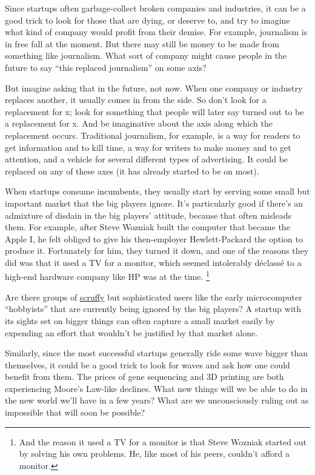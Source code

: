 \documentclass[12pt]{book}
\begin{document}
Since startups often garbage-collect broken companies and industries, it
can be a good trick to look for those that are dying, or deserve to, and
try to imagine what kind of company would profit from their demise. For
example, journalism is in free fall at the moment. But there may still
be money to be made from something like journalism. What sort of company
might cause people in the future to say ``this replaced journalism'' on
some axis?

But imagine asking that in the future, not now. When one company or
industry replaces another, it usually comes in from the side. So don't
look for a replacement for x; look for something that people will later
say turned out to be a replacement for x. And be imaginative about the
axis along which the replacement occurs. Traditional journalism, for
example, is a way for readers to get information and to kill time, a way
for writers to make money and to get attention, and a vehicle for
several different types of advertising. It could be replaced on any of
these axes (it has already started to be on most).

When startups consume incumbents, they usually start by serving some
small but important market that the big players ignore. It's
particularly good if there's an admixture of disdain in the big players'
attitude, because that often misleads them. For example, after Steve
Wozniak built the computer that became the Apple I, he felt obliged to
give his then-employer Hewlett-Packard the option to produce it.
Fortunately for him, they turned it down, and one of the reasons they
did was that it used a TV for a monitor, which seemed intolerably
déclassé to a high-end hardware company like HP was at the time.
\footnote{And the reason it used a TV for a monitor is that Steve Wozniak
started out by solving his own problems. He, like most of his peers,
couldn't afford a monitor.}

Are there groups of \href{marginal.html}{scruffy} but sophisticated
users like the early microcomputer ``hobbyists'' that are currently
being ignored by the big players? A startup with its sights set on
bigger things can often capture a small market easily by expending an
effort that wouldn't be justified by that market alone.

Similarly, since the most successful startups generally ride some wave
bigger than themselves, it could be a good trick to look for waves and
ask how one could benefit from them. The prices of gene sequencing and
3D printing are both experiencing Moore's Law-like declines. What new
things will we be able to do in the new world we'll have in a few years?
What are we unconsciously ruling out as impossible that will soon be
possible?
\end{document}
